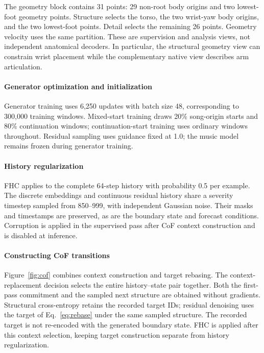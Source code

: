 The geometry block contains 31 points: 29 non-root body origins and two lowest-foot geometry points. Structure selects the torso, the two wrist-yaw body origins, and the two lowest-foot points. Detail selects the remaining 26 points. Geometry velocity uses the same partition. These are supervision and analysis views, not independent anatomical decoders. In particular, the structural geometry view can constrain wrist placement while the complementary native view describes arm articulation.

\paragraph{Generator optimization and initialization}
Generator training uses 6,250 updates with batch size 48, corresponding to
300,000 training windows. Mixed-start training draws 20\% song-origin starts
and 80\% continuation windows; continuation-start training uses ordinary
windows throughout. Residual sampling uses guidance fixed at 1.0;
the music model remains frozen during generator training.

\paragraph{History regularization}
FHC applies to the complete 64-step history with probability 0.5 per example. The discrete embeddings and continuous residual history share a severity timestep sampled from 850--999, with independent Gaussian noise. Their masks and timestamps are preserved, as are the boundary state and forecast conditions. Corruption is applied in the supervised pass after CoF context construction and is disabled at inference.

\paragraph{Constructing CoF transitions}
Figure~\ref{fig:cof} combines context construction and target rebasing. The
context-replacement decision selects the entire history--state pair together.
Both the first-pass commitment and the sampled next structure are obtained
without gradients. Structural cross-entropy retains the recorded target IDs;
residual denoising uses the target of Eq.~\eqref{eq:rebase} under the same
sampled structure. The recorded target is not re-encoded with the generated
boundary state. FHC is applied after this context selection, keeping target
construction separate from history regularization.

